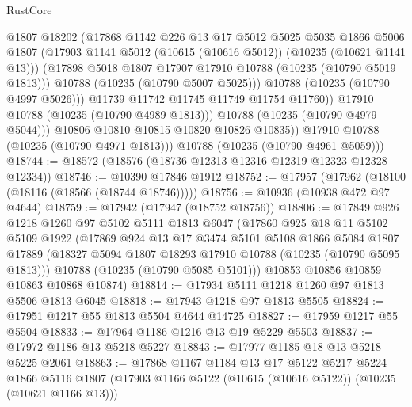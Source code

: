 \begin{lexlean}{RustCore}
\begin{coremodule}
                      @1807
                      @18202
                      (@17868
                        @1142
                        @226
                        @13
                        @17
                        @5012
                        @5025
                        @5035
                        @1866
                        @5006
                        @1807
                        (@17903 @1141 @5012 (@10615 (@10616 @5012)) (@10235 (@10621 @1141 @13)))
                        (@17898 @5018 @1807 @17907 @17910 @10788 (@10235 (@10790 @5019 @1813)))
                        @10788
                        (@10235 (@10790 @5007 @5025)))
                      @10788
                      (@10235 (@10790 @4997 @5026)))
                    @11739
                    @11742
                    @11745
                    @11749
                    @11754
                    @11760))
                @17910
                @10788
                (@10235 (@10790 @4989 @1813)))
              @10788
              (@10235 (@10790 @4979 @5044)))
            @10806
            @10810
            @10815
            @10820
            @10826
            @10835))
        @17910
        @10788
        (@10235 (@10790 @4971 @1813)))
      @10788
      (@10235 (@10790 @4961 @5059)))
@18744 := @18572 (@18576 (@18736 @12313 @12316 @12319 @12323 @12328 @12334))
@18746 := @10390 @17846 @1912
@18752 := @17957 (@17962 (@18100 (@18116 (@18566 (@18744 @18746)))))
@18756 := @10936 (@10938 @472 @97 @4644)
@18759 := @17942 (@17947 (@18752 @18756))
@18806 := @17849
    @926
    @1218
    @1260
    @97
    @5102
    @5111
    @1813
    @6047
    (@17860
      @925
      @18
      @11
      @5102
      @5109
      @1922
      (@17869
        @924
        @13
        @17
        @3474
        @5101
        @5108
        @1866
        @5084
        @1807
        @17889
        (@18327 @5094 @1807 @18293 @17910 @10788 (@10235 (@10790 @5095 @1813)))
        @10788
        (@10235 (@10790 @5085 @5101)))
      @10853
      @10856
      @10859
      @10863
      @10868
      @10874)
@18814 := @17934 @5111 @1218 @1260 @97 @1813 @5506 @1813 @6045
@18818 := @17943 @1218 @97 @1813 @5505
@18824 := @17951 @1217 @55 @1813 @5504 @4644 @14725
@18827 := @17959 @1217 @55 @5504
@18833 := @17964 @1186 @1216 @13 @19 @5229 @5503
@18837 := @17972 @1186 @13 @5218 @5227
@18843 := @17977 @1185 @18 @13 @5218 @5225 @2061
@18863 := @17868
    @1167
    @1184
    @13
    @17
    @5122
    @5217
    @5224
    @1866
    @5116
    @1807
    (@17903 @1166 @5122 (@10615 (@10616 @5122)) (@10235 (@10621 @1166 @13)))

\end{coremodule}
\end{lexlean}
